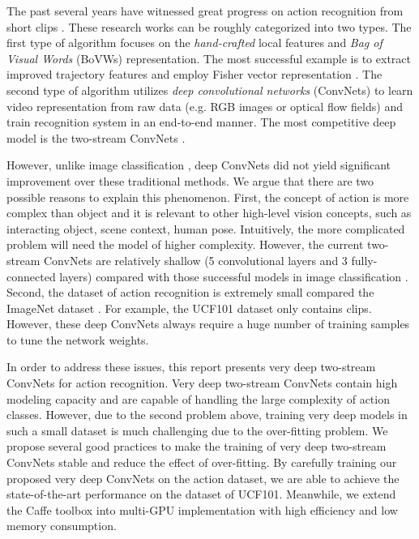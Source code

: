 \documentclass[10pt,twocolumn,letterpaper]{article}
\begin{document}
The past several years have witnessed great progress on action recognition from short clips \cite{Lan15,Ng15,SimonyanZ14,WangS13a,WangQT13b,WangQT13a,WangQT15a}. These research works can be roughly categorized into two types. The first type of algorithm focuses on the \emph{hand-crafted} local features and \emph{Bag of Visual Words} (BoVWs) representation. The most successful example is to extract improved trajectory features \cite{WangS13a} and employ Fisher vector representation \cite{SanchezPMV13}. The second type of algorithm utilizes \emph{deep convolutional networks} (ConvNets) to learn video representation from raw data (e.g. RGB images or optical flow fields) and train recognition system in an end-to-end manner. The most competitive deep model is the two-stream ConvNets \cite{SimonyanZ14}.

However, unlike image classification \cite{KrizhevskySH12}, deep ConvNets did not yield significant improvement over these traditional methods. We argue that there are two possible reasons to explain this phenomenon. First, the concept of action is more complex than object and it is relevant to other high-level vision concepts, such as interacting object, scene context, human pose. Intuitively, the more complicated problem will need the model of higher complexity. However, the current two-stream ConvNets are relatively shallow (5 convolutional layers and 3 fully-connected layers) compared with those successful models in image classification \cite{SimonyanZ14a,SzegedyLJSRAEVR14}. Second, the dataset of action recognition is extremely small compared the ImageNet dataset \cite{DengDSLL009}. For example, the UCF101 dataset \cite{Soomro12} only contains  clips. However, these deep ConvNets always require a huge number of training samples to tune the network weights.

In order to address these issues, this report presents very deep two-stream ConvNets for action recognition. Very deep two-stream ConvNets contain high modeling capacity and are capable of handling the large complexity of action classes. However, due to the second problem above, training very deep models in such a small dataset is much challenging due to the over-fitting problem. We propose several good practices to make the training of very deep two-stream ConvNets stable and reduce the effect of over-fitting. By carefully training our proposed very deep ConvNets on the action dataset, we are able to achieve the state-of-the-art performance on the dataset of UCF101. Meanwhile, we extend the Caffe toolbox \cite{JiaSDKLGGD14} into multi-GPU implementation with high efficiency and low memory consumption. 
\end{document}
